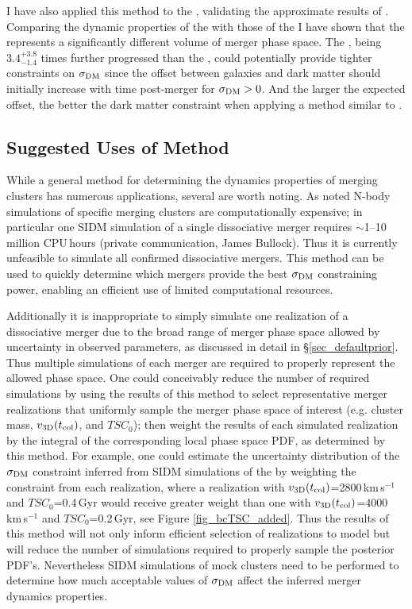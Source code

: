 I have also applied this method to the , validating the approximate results of \citet{Dawson:2012dl}.
Comparing the dynamic properties of the  with those of the  I have shown that the  represents a significantly different volume of merger phase space.
The , being $3.4^{+3.8}_{-1.4}$ times further progressed than the , could potentially provide tighter constraints on $\sigma_{\rm DM}$ since the offset between galaxies and dark matter should initially increase with time post-merger for  $\sigma_{\rm DM}>0$.
And the larger the expected offset, the better the dark matter constraint when applying a method similar to \citet{Randall:2008hs}.

\subsection{Suggested Uses of Method}\label{sec_suggestions}

While a general method for determining the dynamics properties of merging clusters has numerous applications, several are worth noting.
As noted N-body simulations of specific merging clusters are computationally expensive; in particular one SIDM simulation of a single dissociative merger requires $\sim$1--10 million CPU\,hours (private communication, James Bullock). 
Thus it is currently unfeasible to simulate all confirmed dissociative mergers.
This method can be used to quickly determine which mergers provide the best $\sigma_{\rm DM}$ constraining power, enabling an efficient use of limited computational resources.

Additionally it is inappropriate to simply simulate one realization of a dissociative merger due to the broad range of merger phase space allowed by uncertainty in observed parameters, as discussed in detail in \S\ref{sec_defaultprior}.
Thus multiple simulations of each merger are required to properly represent the allowed phase space.
One could conceivably reduce the number of required simulations by using the results of this method to select representative merger realizations that uniformly sample the merger phase space of interest (e.g. cluster mass, $v_{\rm 3D}(t_{\rm col})$, and $TSC_0$);
then weight the results of each simulated realization by the integral of the corresponding local phase space PDF, as determined by this method.
For example, one could estimate the uncertainty distribution of the $\sigma_{\rm DM}$ constraint inferred from SIDM simulations of the  by weighting the constraint from each realization, where a realization with  $v_{\rm 3D}(t_{\rm col})$=2800\,km\,s$^{-1}$ and $TSC_0$=0.4\,Gyr would receive greater weight than one with $v_{\rm 3D}(t_{\rm col})$=4000\,km\,s$^{-1}$ and $TSC_0$=0.2\,Gyr, see Figure \ref{fig_bcTSC_added}.
Thus the results of this method will not only inform efficient selection of realizations to model but will reduce the number of simulations required to properly sample the posterior PDF's.
Nevertheless SIDM simulations of mock clusters need to be performed to determine how much acceptable values of $\sigma_{\rm DM}$ affect the inferred merger dynamics properties.

